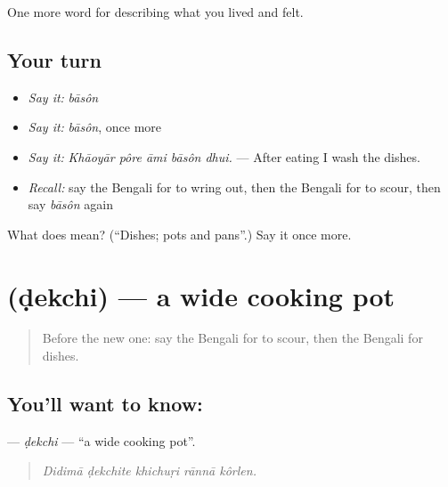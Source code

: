 \begin{grammarlens}[title={What you've built}]
One more word for describing what you lived and felt.
\end{grammarlens}

\subsection*{Your turn}
\begin{itemize}
\raggedright
  \item \emph{Say it:} \emph{bāsôn}
  \item \emph{Say it:} \emph{bāsôn}, once more
  \item \emph{Say it:} \emph{Khāoyār pôre āmi bāsôn dhui.} — After eating I wash the dishes.
  \item \emph{Recall:} say the Bengali for to wring out, then the Bengali for to scour, then say \emph{bāsôn} again
\end{itemize}

\begin{tcolorbox}[breakable,colback=teal!4,colframe=teal!35!black,title={Before you move on}]
What does  mean? (\textquotedblleft{}Dishes; pots and pans\textquotedblright{}.) Say it once more.
\end{tcolorbox}
\section[\texorpdfstring{\bn{ডেকচি} (ḍekchi)}{ডেকচি (ḍekchi)}]{ (ḍekchi) — a wide cooking pot}

\label{lesson:BN-C511-dekchi}



\begin{quote}
Before the new one: say the Bengali for to scour, then the Bengali for dishes.
\end{quote}

\subsection*{You'll want to know: }
\textbf{} — \emph{ḍekchi} — \textquotedblleft{}a wide cooking pot\textquotedblright{}.

\begin{quote}
    
\end{quote}

\begin{quote}
\emph{Didimā ḍekchite khichuṛi rānnā kôrlen.}
\end{quote}

